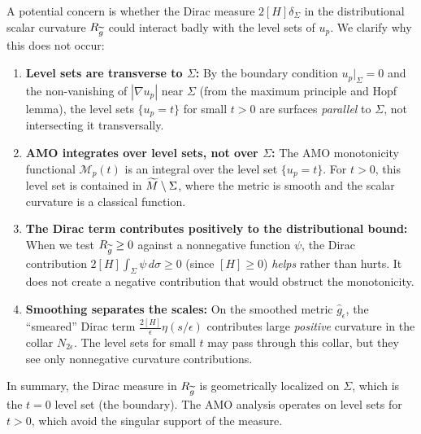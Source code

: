 \begin{remark}\label{rem:DiracLevelSetInteraction}
A potential concern is whether the Dirac measure $2[H]\delta_\Sigma$ in the distributional scalar curvature $R_{\widetilde{g}}$ could interact badly with the level sets of $u_p$. We clarify why this does not occur:
\begin{enumerate}
    \item \textbf{Level sets are transverse to $\Sigma$:} By the boundary condition $u_p|_\Sigma = 0$ and the non-vanishing of $|\nabla u_p|$ near $\Sigma$ (from the maximum principle and Hopf lemma), the level sets $\{u_p = t\}$ for small $t > 0$ are surfaces \emph{parallel} to $\Sigma$, not intersecting it transversally.
    
    \item \textbf{AMO integrates over level sets, not over $\Sigma$:} The AMO monotonicity functional $\mathcal{M}_p(t)$ is an integral over the level set $\{u_p = t\}$. For $t > 0$, this level set is contained in $\widetilde{M} \setminus \Sigma$, where the metric is smooth and the scalar curvature is a classical function.
    
    \item \textbf{The Dirac term contributes positively to the distributional bound:} When we test $R_{\widetilde{g}} \ge 0$ against a nonnegative function $\psi$, the Dirac contribution $2[H] \int_\Sigma \psi \, d\sigma \ge 0$ (since $[H] \ge 0$) \emph{helps} rather than hurts. It does not create a negative contribution that would obstruct the monotonicity.
    
    \item \textbf{Smoothing separates the scales:} On the smoothed metric $\hat{g}_\epsilon$, the ``smeared'' Dirac term $\frac{2[H]}{\epsilon}\eta(s/\epsilon)$ contributes large \emph{positive} curvature in the collar $N_{2\epsilon}$. The level sets for small $t$ may pass through this collar, but they see only nonnegative curvature contributions.
\end{enumerate}
In summary, the Dirac measure in $R_{\widetilde{g}}$ is geometrically localized on $\Sigma$, which is the $t=0$ level set (the boundary). The AMO analysis operates on level sets for $t > 0$, which avoid the singular support of the measure.
\end{remark}

